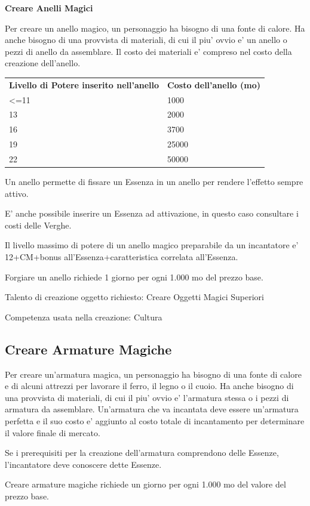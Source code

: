 \documentclass[a4paper,11pt,twoside,openany]{book}
\begin{document}
{\textbf{Creare Anelli Magici}

Per creare un anello magico, un personaggio ha bisogno di una fonte di calore. Ha anche bisogno di una provvista di materiali, di cui il piu' ovvio e' un anello o pezzi di anello da assemblare. Il costo dei materiali e' compreso nel costo della creazione dell'anello.

\bigskip

\begin{tabular}{ll}
\toprule
\textbf{Livello di Potere inserito nell'anello} & \textbf{Costo dell'anello (mo)}\tabularnewline
\textless=11 & 1000\tabularnewline
13 & 2000\tabularnewline
16 & 3700\tabularnewline
19 & 25000\tabularnewline
22 & 50000\tabularnewline
\end{tabular}

\bigskip

Un anello permette di fissare un Essenza in un anello per rendere l'effetto sempre attivo.

E' anche possibile inserire un Essenza ad attivazione, in questo caso consultare i costi delle Verghe.

Il livello massimo di potere di un anello magico preparabile da un incantatore e' 12+CM+bonus all'Essenza+caratteristica correlata all'Essenza.

Forgiare un anello richiede 1 giorno per ogni 1.000 mo del prezzo base.

Talento di creazione oggetto richiesto: Creare Oggetti Magici Superiori

Competenza usata nella creazione: Cultura

\subsection{Creare Armature Magiche}

Per creare un'armatura magica, un personaggio ha bisogno di una fonte di calore e di alcuni attrezzi per lavorare il ferro, il legno o il cuoio. Ha anche bisogno di una provvista di materiali, di cui il piu' ovvio e' l'armatura stessa o i pezzi di armatura da assemblare. Un'armatura che va incantata deve essere un'armatura perfetta e il suo costo e' aggiunto al costo totale di incantamento per determinare il valore finale di mercato.

Se i prerequisiti per la creazione dell'armatura comprendono delle Essenze, l'incantatore deve conoscere dette Essenze. 

Creare armature magiche richiede un giorno per ogni 1.000 mo del valore
del prezzo base.

}
\end{document}
